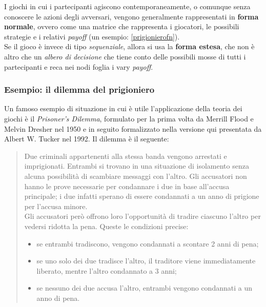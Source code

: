 I giochi in cui i partecipanti agiscono contemporaneamente, o comunque senza conoscere le azioni degli avversari, vengono generalmente rappresentati in \textbf{forma normale}, ovvero come una matrice che rappresenta i giocatori, le possibili strategie e i relativi \emph{payoff} (un esempio: \ref{prigionierofn}).\\
Se il gioco è invece di tipo \emph{sequenziale}, allora si usa la \textbf{forma estesa}, che non è altro che un \emph{albero di decisione} che tiene conto delle possibili mosse di tutti i partecipanti e reca nei nodi foglia i vary \emph{payoff}.\\



\subsubsection*{Esempio: il dilemma del prigioniero}

Un famoso esempio di situazione in cui è utile l'applicazione della teoria dei giochi è il \emph{Prisoner's Dilemma}, formulato per la prima volta da Merrill Flood e Melvin Dresher nel 1950 e in seguito formalizzato nella versione qui presentata da Albert W. Tucker nel 1992.
Il dilemma è il seguente:

\begin{quote}
   Due criminali appartenenti alla stessa banda vengono arrestati e imprigionati. Entrambi si trovano in una situazione di isolamento senza alcuna possibilità di scambiare messaggi con l'altro. Gli accusatori non hanno le prove necessarie per condannare i due in base all'accusa principale; i due infatti sperano di essere condannati a un anno di prigione per l'accusa minore.\\
   Gli accusatori però offrono loro l'opportunità di tradire ciascuno l'altro per vedersi ridotta la pena.
   Queste le condizioni precise:
   \begin{itemize}
      \item se entrambi tradiscono, vengono condannati a scontare 2 anni di pena;
      \item se uno solo dei due tradisce l'altro, il traditore viene immediatamente liberato, mentre l'altro condannato a 3 anni;
      \item se nessuno dei due accusa l'altro, entrambi vengono condannati a un anno di pena.
   \end{itemize}
   
\end{quote}



